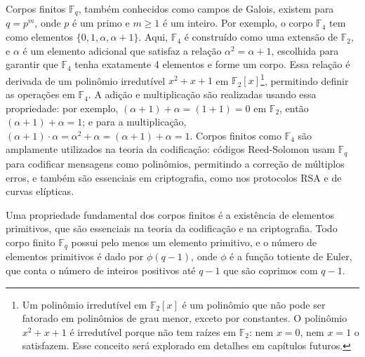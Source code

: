 \begin{example}
Corpos finitos $\mathbb{F}_q$, também conhecidos como campos de Galois,
existem para $q = p^m$, onde $p$ é um primo e $m \geq 1$ é um
inteiro. Por exemplo, o corpo $\mathbb{F}_4$ tem como elementos $\{0, 1, \alpha, \alpha + 1\}$.
Aqui, $\mathbb{F}_4$ é construído como uma extensão de $\mathbb{F}_2$, e $\alpha$
é um elemento adicional que satisfaz a relação $\alpha^2 = \alpha + 1$,
escolhida para garantir que $\mathbb{F}_4$ tenha exatamente 4 elementos
e forme um corpo. Essa relação é derivada de um polinômio irredutível
$x^2 + x + 1$ em $\mathbb{F}_2[x]$\footnote{
  Um polinômio irredutível em $\mathbb{F}_2[x]$ é um polinômio
  que não pode ser fatorado em polinômios de grau menor, exceto por constantes. O
  polinômio $x^2 + x + 1$ é irredutível porque não tem raízes em $\mathbb{F}_2$:
  nem $x = 0$, nem $x = 1$ o satisfazem. Esse conceito
  será explorado em detalhes em capítulos futuros.},
  permitindo definir as operações em $\mathbb{F}_4$. A adição e multiplicação 
são realizadas usando essa propriedade: por exemplo, $(\alpha + 1) + \alpha = (1 + 1) = 0$ 
em $\mathbb{F}_2$, então $(\alpha + 1) + \alpha = 1$; e para a multiplicação,
$(\alpha + 1) \cdot \alpha = \alpha^2 + \alpha = (\alpha + 1) + \alpha = 1$. 
Corpos finitos como $\mathbb{F}_4$ são amplamente utilizados na teoria
da codificação: códigos Reed-Solomon usam $\mathbb{F}_q$ para codificar
mensagens como polinômios, permitindo a correção de múltiplos erros, e também
são essenciais em criptografia, como nos protocolos RSA e de curvas elípticas.
\end{example}




Uma propriedade fundamental dos corpos finitos é a existência de elementos
primitivos, que são essenciais na teoria da codificação e na criptografia. Todo
corpo finito $\mathbb{F}_q$ possui pelo menos um elemento primitivo, e o
número de elementos primitivos é dado por $\phi(q-1)$, onde $\phi$ é a
função totiente de Euler, que conta o número de inteiros positivos até $q-1$
que são coprimos com $q-1$.

